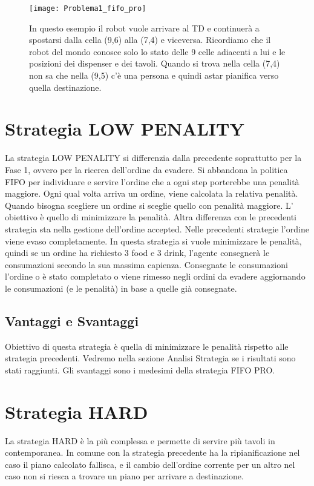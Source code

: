 \begin{SCfigure}[]
\centering
\texttt{[image: Problema1\_fifo\_pro]}
\caption{In questo esempio il robot vuole arrivare al TD e continuerà a spostarsi dalla cella (9,6) alla (7,4) e viceversa. Ricordiamo che il robot del mondo conosce solo lo stato delle 9 celle adiacenti a lui e le posizioni dei dispenser e dei tavoli. Quando si trova nella cella (7,4) non sa che nella (9,5) c'è una persona e quindi astar pianifica verso quella destinazione.}
\label{fig:figure6}
\end{SCfigure}

\section{Strategia LOW PENALITY}
La strategia LOW PENALITY si differenzia dalla precedente soprattutto per la Fase 1, ovvero per la ricerca dell'ordine da evadere. Si abbandona la politica FIFO per individuare e servire l'ordine che a ogni step porterebbe una penalità maggiore. Ogni qual volta arriva un ordine, viene calcolata la relativa penalità. Quando bisogna scegliere un ordine si sceglie quello con penalità maggiore. L' obiettivo è quello di minimizzare la penalità.
Altra differenza con le precedenti strategia sta nella gestione dell'ordine accepted. Nelle precedenti strategie l'ordine viene evaso completamente. In questa strategia si vuole minimizzare le penalità, quindi se un ordine ha richiesto 3 food e 3 drink, l'agente consegnerà le consumazioni secondo la sua massima capienza. Consegnate le consumazioni l'ordine o è stato completato o viene rimesso negli ordini da evadere aggiornando le consumazioni (e le penalità) in base a quelle già consegnate.

\subsection{Vantaggi e Svantaggi}
Obiettivo di questa strategia è quella di minimizzare le penalità rispetto alle strategia precedenti. Vedremo nella sezione Analisi Strategia se i risultati sono stati raggiunti. Gli svantaggi sono i medesimi della strategia FIFO PRO.

\section{Strategia HARD}
La strategia HARD è la più complessa e permette di servire più tavoli in contemporanea. In comune con la strategia precedente ha la ripianificazione nel caso il piano calcolato fallisca, e il cambio dell'ordine corrente per un altro nel caso non si riesca a trovare un piano per arrivare a destinazione.

